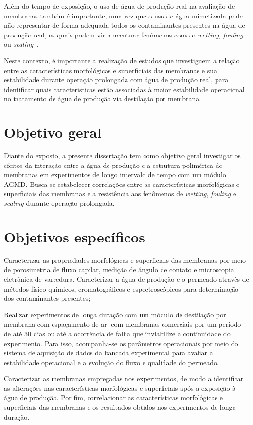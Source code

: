 Além do tempo de exposição, o uso de água de produção real na avaliação de membranas também é importante, uma vez que o uso de água mimetizada pode não representar de forma adequada todos os contaminantes presentes na água de produção real, os quais podem vir a acentuar fenômenos como o \textit{wetting}, \textit{fouling} ou \textit{scaling}~\cite{Wang2023ShaleGas, Habib2024MembraneDistillation}.

Neste contexto, é importante a realização de estudos que investiguem a relação entre as características morfológicas e superficiais das membranas e sua estabilidade durante operação prolongada com água de produção real, para identificar quais caracteristicas estão associadas à maior estabilidade operacional no tratamento de água de produção via destilação por membrana.

\section{Objetivo geral}

Diante do exposto, a presente dissertação tem como objetivo geral investigar os efeitos da interação entre a água de produção e a estrutura polimérica de membranas em experimentos de longo intervalo de tempo com um módulo AGMD. Busca-se estabelecer correlações entre as características morfológicas e superficiais das membranas e a resistência aos fenômenos de \textit{wetting}, \textit{fouling} e \textit{scaling} durante operação prolongada. 

\section{Objetivos específicos}

Caracterizar as propriedades morfológicas e superficiais das membranas por meio de porosimetria de fluxo capilar, medição de ângulo de contato e microscopia eletrônica de varredura. Caracterizar a água de produção e o permeado através de métodos físico-químicos, cromatográficos e espectroscópicos para determinação dos contaminantes presentes;

Realizar experimentos de longa duração com um módulo de destilação por membrana com espaçamento de ar, com membranas comerciais por um período de até 30 dias ou até a ocorrência de falha que inviabilize a continuidade do experimento. Para isso, acompanha-se os parâmetros operacionais por meio do sistema de aquisição de dados da bancada experimental para avaliar a estabilidade operacional e a evolução do fluxo e qualidade do permeado.

Caracterizar as membranas empregadas nos experimentos, de modo a identificar as alterações nas características morfológicas e superficiais após a exposição à água de produção. Por fim, correlacionar as características morfológicas e superficiais das membranas e os resultados obtidos nos experimentos de longa duração.



 


